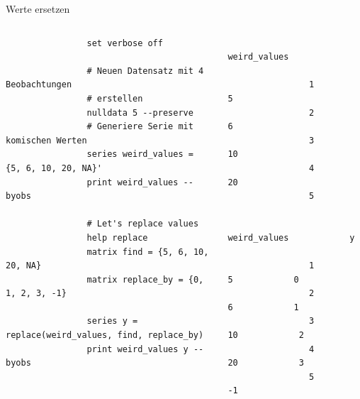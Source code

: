 \documentclass{beamer}[11pt]
\begin{document}
\begin{frame}[fragile]{Werte ersetzen}
	\begin{columns}[T] %
		\scriptsize
		\begin{column}{.55\textwidth}
			\begin{verbatim}
				set verbose off

				# Neuen Datensatz mit 4 Beobachtungen
				# erstellen
				nulldata 5 --preserve
				# Generiere Serie mit komischen Werten
				series weird_values = {5, 6, 10, 20, NA}'
				print weird_values --byobs

				# Let's replace values
				help replace
				matrix find = {5, 6, 10, 20, NA}
				matrix replace_by = {0, 1, 2, 3, -1}

				series y = replace(weird_values, find, replace_by)
				print weird_values y --byobs
			\end{verbatim}
		\end{column}

		\begin{column}{.45\textwidth}
			\tiny
			\begin{verbatim}
				weird_values

				1            5
				2            6
				3           10
				4           20
				5

				weird_values            y

				1            5            0
				2            6            1
				3           10            2
				4           20            3
				5                        -1
			\end{verbatim}
	  \end{column}
	\end{columns}
\end{frame}
\end{document}
